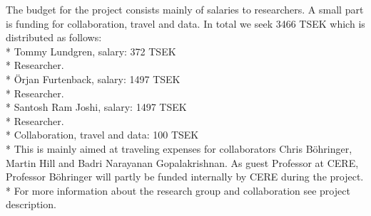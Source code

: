 \documentclass[11pt,a4paper]{extarticle}
\begin{document}
The budget for the project consists mainly of salaries to researchers. A small part is funding
for collaboration, travel and data. In total we seek 3466 TSEK which is distributed as follows:\\*
Tommy Lundgren, salary: 372 TSEK\\*
Researcher.\\*
Örjan Furtenback, salary: 1497 TSEK\\*
Researcher.\\*
Santosh Ram Joshi, salary: 1497 TSEK\\*
Researcher.\\*
Collaboration, travel and data: 100 TSEK\\*
This is mainly aimed at traveling expenses for collaborators Chris Böhringer, Martin Hill and Badri Narayanan Gopalakrishnan. As guest Professor at CERE, Professor Böhringer will partly be funded internally
by CERE during the project.\\*
For more information about the research group and collaboration see project description.
\end{document}
